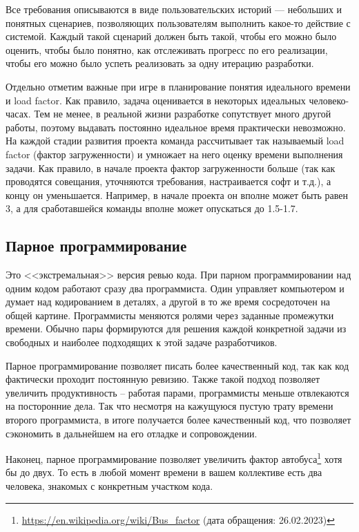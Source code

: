\documentclass{../../text-style}
\begin{document}
Все требования описываются в виде пользовательских историй --- небольших и понятных сценариев, позволяющих пользователям выполнить какое-то действие с системой. Каждый такой сценарий должен быть такой, чтобы его можно было оценить, чтобы было понятно, как отслеживать прогресс по его реализации, чтобы его можно было успеть реализовать за одну итерацию разработки.

Отдельно отметим важные при игре в планирование понятия идеального времени и load factor. Как правило, задача оценивается в некоторых идеальных человеко-часах. Тем не менее, в реальной жизни разработке сопутствует много другой работы, поэтому выдавать постоянно идеальное время практически невозможно. На каждой стадии развития проекта команда рассчитывает так называемый load factor (фактор загруженности) и умножает на него оценку времени выполнения задачи. Как правило, в начале проекта фактор загруженности больше (так как проводятся совещания, уточняются требования, настраивается софт и т.д.), а концу он уменьшается. Например, в начале проекта он вполне может быть равен 3, а для сработавшейся команды вполне может опускаться до 1.5-1.7.

\subsection{Парное программирование}

Это <<экстремальная>> версия ревью кода. При парном программировании над одним кодом работают сразу два программиста. Один управляет компьютером и думает над кодированием в деталях, а другой в то же время сосредоточен на общей картине. Программисты меняются ролями через заданные промежутки времени. Обычно пары формируются для решения каждой конкретной задачи из свободных и наиболее подходящих к этой задаче разработчиков.

Парное программирование позволяет писать более качественный код, так как код фактически проходит постоянную ревизию. Также такой подход позволяет увеличить продуктивность -- работая парами, программисты меньше отвлекаются на посторонние дела. Так что несмотря на кажущуюся пустую трату времени второго программиста, в итоге получается более качественный код, что позволяет сэкономить в дальнейшем на его отладке и сопровождении.

Наконец, парное программирование позволяет увеличить фактор автобуса\footnote{\url{https://en.wikipedia.org/wiki/Bus_factor} (дата обращения: 26.02.2023)} хотя бы до двух. То есть в любой момент времени в вашем коллективе есть два человека, знакомых с конкретным участком кода.
\end{document}
